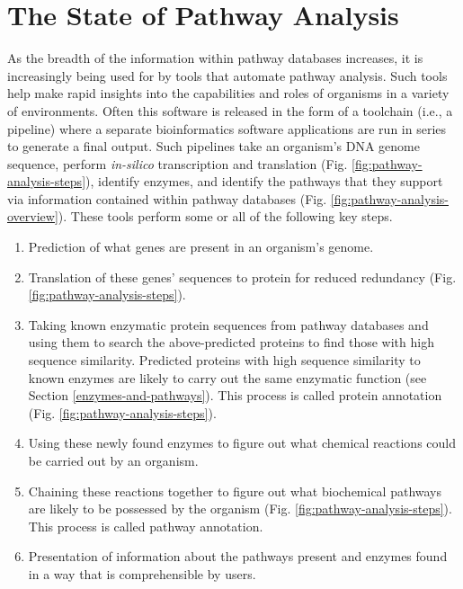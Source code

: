 \section{The State of Pathway Analysis}

As the breadth of the information within pathway databases increases, it is 
increasingly being used for by tools that automate pathway analysis. Such tools 
help make rapid insights into the capabilities and roles of organisms in a 
variety of environments. Often this software is released in the form of a 
toolchain (i.e., a pipeline) where a separate bioinformatics software 
applications are run in series to generate a final output. Such pipelines take 
an organism's DNA genome sequence, perform \textit{in-silico} transcription and 
translation (Fig. \ref{fig:pathway-analysis-steps}), identify enzymes, and 
identify the pathways that they support via information contained within pathway 
databases (Fig. \ref{fig:pathway-analysis-overview}). These tools perform some 
or all of the following key steps.

\begin{enumerate}
\item Prediction of what genes are present in an organism's genome.
\item Translation of these genes' sequences to protein for reduced redundancy 
(Fig. \ref{fig:pathway-analysis-steps}).
\item Taking known enzymatic protein sequences from pathway databases and using 
them to search the above-predicted proteins to find those with high sequence 
similarity. Predicted proteins with high sequence similarity to known enzymes 
are likely to carry out the same enzymatic function (see Section 
\ref{enzymes-and-pathways}). This process is called protein annotation (Fig. 
\ref{fig:pathway-analysis-steps}).
\item Using these newly found enzymes to figure out what chemical reactions 
could be carried out by an organism.
\item Chaining these reactions together to figure out what biochemical pathways 
are likely to be possessed by the organism (Fig. 
\ref{fig:pathway-analysis-steps}). This process is called pathway annotation.
\item Presentation of information about the pathways present and enzymes found 
in a way that is comprehensible by users.
\end{enumerate}

